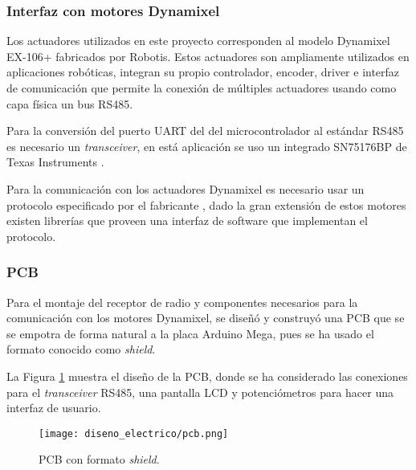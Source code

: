 \subsubsection{Interfaz con motores Dynamixel}

Los actuadores utilizados en este proyecto corresponden al modelo Dynamixel EX-106+ fabricados por Robotis. Estos actuadores son ampliamente utilizados en aplicaciones robóticas, integran su propio controlador, encoder, driver e interfaz de comunicación que permite la conexión de múltiples actuadores usando como capa física un bus RS485.

Para la conversión del puerto UART del del microcontrolador al estándar RS485 es necesario un \textit{transceiver}, en está aplicación se uso un integrado SN75176BP de Texas Instruments \cite{ic_rs485}.

Para la comunicación con los actuadores Dynamixel es necesario usar un protocolo especificado por el fabricante \cite{motor_datasheet}, dado la gran extensión de estos motores existen librerías que proveen una interfaz de software que implementan el protocolo.

\subsubsection{PCB}

Para el montaje del receptor de radio y componentes necesarios para la comunicación con los motores Dynamixel, se diseñó y construyó una PCB que se se empotra de forma natural a la placa Arduino Mega, pues se ha usado el formato conocido como \textit{shield}.

La Figura \ref{de_pcb} muestra el diseño de la PCB, donde se ha considerado las conexiones para el \textit{transceiver} RS485, una pantalla LCD y potenciómetros para hacer una interfaz de usuario.

\begin{figure}[H]
\begin{center}
	\texttt{[image: diseno\_electrico/pcb.png]}
	\caption{PCB con formato \textit{shield}.}
	\label{de_pcb}
\end{center}
\end{figure}



